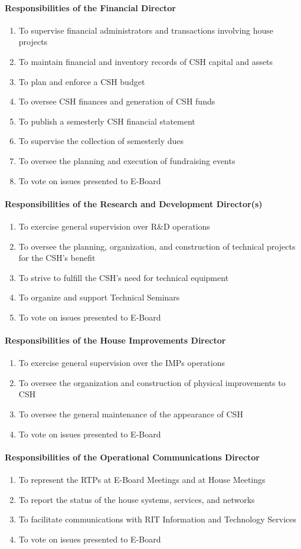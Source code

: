 \documentclass{article}
\newcommand{\asubsubsection}[1]{\paragraph{#1} \label{#1}}
\begin{document}
\asubsubsection{Responsibilities of the Financial Director}
\begin{enumerate}
	\item To supervise financial administrators and transactions involving house projects
	\item To maintain financial and inventory records of CSH capital and assets
	\item To plan and enforce a CSH budget
	\item To oversee CSH finances and generation of CSH funds
	\item To publish a semesterly CSH financial statement
	\item To supervise the collection of semesterly dues
	\item To oversee the planning and execution of fundraising events
	\item To vote on issues presented to E-Board
\end{enumerate}

\asubsubsection{Responsibilities of the Research and Development Director(s)}
\begin{enumerate}
	\item To exercise general supervision over R\&D operations
	\item To oversee the planning, organization, and construction of technical projects for the CSH's benefit
	\item To strive to fulfill the CSH's need for technical equipment
	\item To organize and support Technical Seminars
	\item To vote on issues presented to E-Board
\end{enumerate}

\asubsubsection{Responsibilities of the House Improvements Director}
\begin{enumerate}
	\item To exercise general supervision over the IMPs operations
	\item To oversee the organization and construction of physical improvements to CSH
	\item To oversee the general maintenance of the appearance of CSH
	\item To vote on issues presented to E-Board
\end{enumerate}

\asubsubsection{Responsibilities of the Operational Communications Director}
\begin{enumerate}
	\item To represent the RTPs at E-Board Meetings and at House Meetings
	\item To report the status of the house systems, services, and networks
	\item To facilitate communications with RIT Information and Technology Services
	\item To vote on issues presented to E-Board
\end{enumerate}
\end{document}
